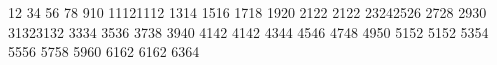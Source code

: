 {12 34 56 78 910 1112}{1112 1314 1516 1718 1920 2122 2122 2324}{2526 2728 2930 3132}{3132 3334 3536 3738 3940 4142 4142 4344 4546 4748 4950 5152 5152 5354 5556 5758 5960 6162 6162 6364}
